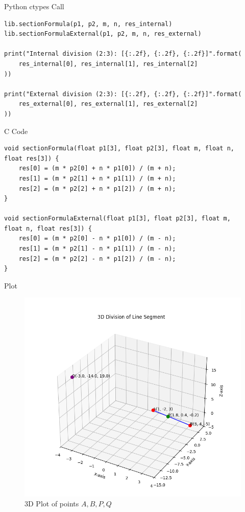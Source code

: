 \documentclass{beamer}
\begin{document}
\begin{frame}[fragile]{Python ctypes Call}
\begin{lstlisting}
lib.sectionFormula(p1, p2, m, n, res_internal)
lib.sectionFormulaExternal(p1, p2, m, n, res_external)

print("Internal division (2:3): [{:.2f}, {:.2f}, {:.2f}]".format(
    res_internal[0], res_internal[1], res_internal[2]
))

print("External division (2:3): [{:.2f}, {:.2f}, {:.2f}]".format(
    res_external[0], res_external[1], res_external[2]
))
\end{lstlisting}
\end{frame}
\begin{frame}[fragile]{C Code}
\begin{lstlisting}
void sectionFormula(float p1[3], float p2[3], float m, float n,
float res[3]) {
    res[0] = (m * p2[0] + n * p1[0]) / (m + n);
    res[1] = (m * p2[1] + n * p1[1]) / (m + n);
    res[2] = (m * p2[2] + n * p1[2]) / (m + n);
}

void sectionFormulaExternal(float p1[3], float p2[3], float m, 
float n, float res[3]) {
    res[0] = (m * p2[0] - n * p1[0]) / (m - n);
    res[1] = (m * p2[1] - n * p1[1]) / (m - n);
    res[2] = (m * p2[2] - n * p1[2]) / (m - n);
}
\end{lstlisting}
\end{frame}

\begin{frame}{Plot}
\begin{figure}
\centering
\includegraphics[width=0.8\linewidth]{figs/fig1.png}
\caption{3D Plot of points \(A, B, P, Q\)}
\label{fig:graph}
\end{figure}
\end{frame}
\end{document}
